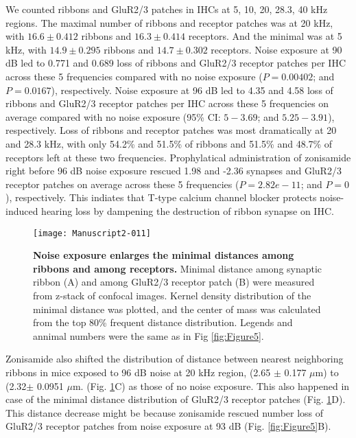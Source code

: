 \documentclass[11pt]{article}
\begin{document}
We counted ribbons and GluR2/3 patches in IHCs at 5, 10, 20, 28.3, 40 kHz regions. The maximal number of ribbons and receptor patches was at 20 kHz, with 
$16.6 \pm 
0.412$ ribbons and 
$16.3 \pm 
0.414$ receptors. 
And the minimal was at 5 kHz, with 
$14.9 \pm 
0.295$ ribbons and 
$14.7 \pm 
0.302$ receptors. 
Noise exposure at 90 dB led to 0.771 and 0.689 loss of ribbons and GluR2/3 receptor patches per IHC across these 5 frequencies compared with no noise exposure 
($P=0.00402$; and 
 $P=0.0167$), respectively. Noise exposure at 96 dB led to 4.35 and 4.58 loss of ribbons and GluR2/3 receptor patches per IHC across these 5 frequencies on average compared with no noise exposure 
(95\% CI: $5 - 3.69$; and 
 $5.25 - 3.91$), respectively. Loss of ribbons and receptor patches was most dramatically at 20 and 28.3 kHz, with only 54.2\% and 51.5\% of ribbons and 
 51.5\% and 48.7\% of receptors left at these two frequencies.
 Prophylatical administration of zonisamide right before 96 dB noise exposure rescued 1.98 and -2.36 synapses and GluR2/3 receptor patches on average across these 5 frequencies 
 ($P=2.82e-11$; and 
 $P=0$), respectively. This indiates that T-type calcium channel blocker protects noise-induced hearing loss by dampening the destruction of ribbon synapse on IHC. 




\begin{figure}[ht!]
\centering
\texttt{[image: Manuscript2-011]}
\caption{{\bf {Noise exposure enlarges the minimal distances among ribbons and among receptors.}}  Minimal distance among synaptic ribbon (A) and among GluR2/3 receptor patch (B) were measured from z-stack of confocal images. Kernel density distribution of the minimal distance was plotted, and the center of mass was calculated from the top 80\% frequent distance distribution. Legends and annimal numbers were the same as in Fig \ref{fig:Figure5}.}
\label{fig:Figure6}
\end{figure}


Zonisamide also shifted the distribution of distance between nearest neighboring ribbons in mice exposed to 96 dB noise at 20 kHz region,
(2.65 $\pm$ 0.177 $\mu$m) to 
(2.32$\pm$ 0.0951 $\mu$m. (Fig. \ref{fig:Figure6}C) as those of no noise exposure. This also happened in case of the minimal distance distribution of GluR2/3 receptor patches (Fig. \ref{fig:Figure6}D). This distance decrease might be because zonisamide rescued number loss of GluR2/3 receptor patches from noise exposure at 93 dB (Fig. \ref{fig:Figure5}B). 
\end{document}
